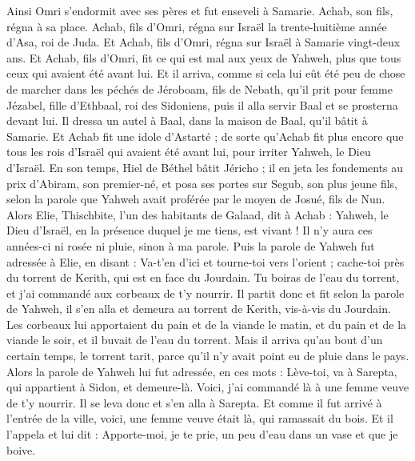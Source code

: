 \begin{multicols}{2}
Ainsi Omri s'endormit avec ses pères et fut enseveli à Samarie. Achab, son fils, régna à sa place.
Achab, fils d'Omri, régna sur Israël la trente-huitième année d'Asa, roi de Juda. Et Achab, fils d'Omri, régna sur Israël à Samarie vingt-deux ans.
Et Achab, fils d'Omri, fit ce qui est mal aux yeux de Yahweh, plus que tous ceux qui avaient été avant lui.
Et il arriva, comme si cela lui eût été peu de chose de marcher dans les péchés de Jéroboam, fils de Nebath, qu'il prit pour femme Jézabel, fille d'Ethbaal, roi des Sidoniens, puis il alla servir Baal et se prosterna devant lui.
Il dressa un autel à Baal, dans la maison de Baal, qu'il bâtit à Samarie.
Et Achab fit une idole d'Astarté ; de sorte qu'Achab fit plus encore que tous les rois d'Israël qui avaient été avant lui, pour irriter Yahweh, le Dieu d'Israël.
En son temps, Hiel de Béthel bâtit Jéricho ; il en jeta les fondements au prix d'Abiram, son premier-né, et posa ses portes sur Segub, son plus jeune fils, selon la parole que Yahweh avait proférée par le moyen de Josué, fils de Nun.
\VerseOne{}Alors Elie, Thischbite, l'un des habitants de Galaad, dit à Achab : Yahweh, le Dieu d'Israël, en la présence duquel je me tiens, est vivant ! Il n'y aura ces années-ci ni rosée ni pluie, sinon à ma parole.
Puis la parole de Yahweh fut adressée à Elie, en disant :
Va-t'en d'ici et tourne-toi vers l'orient ; cache-toi près du torrent de Kerith, qui est en face du Jourdain.
Tu boiras de l'eau du torrent, et j'ai commandé aux corbeaux de t'y nourrir.
Il partit donc et fit selon la parole de Yahweh, il s'en alla et demeura au torrent de Kerith, vis-à-vis du Jourdain.
Les corbeaux lui apportaient du pain et de la viande le matin, et du pain et de la viande le soir, et il buvait de l'eau du torrent.
Mais il arriva qu'au bout d'un certain temps, le torrent tarit, parce qu'il n'y avait point eu de pluie dans le pays.
Alors la parole de Yahweh lui fut adressée, en ces mots :
Lève-toi, va à Sarepta, qui appartient à Sidon, et demeure-là. Voici, j'ai commandé là à une femme veuve de t'y nourrir.
Il se leva donc et s'en alla à Sarepta. Et comme il fut arrivé à l'entrée de la ville, voici, une femme veuve était là, qui ramassait du bois. Et il l'appela et lui dit : Apporte-moi, je te prie, un peu d'eau dans un vase et que je boive.

\end{multicols}
